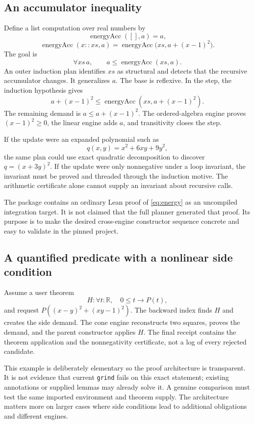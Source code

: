 \documentclass[11pt,letterpaper]{article}
\newcommand{\Lean}{\textsf{Lean}}
\newcommand{\grind}{\texttt{grind}}
\newcommand{\R}{\mathbb{R}}
\theoremstyle{definition}
\theoremstyle{remark}
\begin{document}
\subsection{An accumulator inequality}
Define a list computation over real numbers by
\[
\operatorname{energyAcc}([],a)=a,
\]
\[
\operatorname{energyAcc}(x::xs,a)
=\operatorname{energyAcc}\bigl(xs,a+(x-1)^2\bigr).
\]
The goal is
\begin{equation}\label{eq:energy}
\forall xs\,a,\qquad a\leq\operatorname{energyAcc}(xs,a).
\end{equation}
An outer induction plan identifies $xs$ as structural and detects that the recursive accumulator changes. It generalizes $a$. The base is reflexive. In the step, the induction hypothesis gives
\[
a+(x-1)^2\leq\operatorname{energyAcc}(xs,a+(x-1)^2).
\]
The remaining demand is $a\leq a+(x-1)^2$. The ordered-algebra engine proves $(x-1)^2\geq0$, the linear engine adds $a$, and transitivity closes the step.

If the update were an expanded polynomial such as
\[
q(x,y)=x^2+6xy+9y^2,
\]
the same plan could use exact quadratic decomposition to discover $q=(x+3y)^2$. If the update were only nonnegative under a loop invariant, the invariant must be proved and threaded through the induction motive. The arithmetic certificate alone cannot supply an invariant about recursive calls.

The package contains an ordinary \Lean{} proof of \eqref{eq:energy} as an uncompiled integration target. It is not claimed that the full planner generated that proof. Its purpose is to make the desired cross-engine constructor sequence concrete and easy to validate in the pinned project.

\subsection{A quantified predicate with a nonlinear side condition}
Assume a user theorem
\[
H:\forall t:\R,\quad 0\leq t\to P(t),
\]
and request $P((x-y)^2+(xy-1)^2)$. The backward index finds $H$ and creates the side demand. The cone engine reconstructs two squares, proves the demand, and the parent constructor applies $H$. The final receipt contains the theorem application and the nonnegativity certificate, not a log of every rejected candidate.

This example is deliberately elementary so the proof architecture is transparent. It is not evidence that current \grind{} fails on this exact statement; existing annotations or supplied lemmas may already solve it. A genuine comparison must test the same imported environment and theorem supply. The architecture matters more on larger cases where side conditions lead to additional obligations and different engines.
\end{document}
